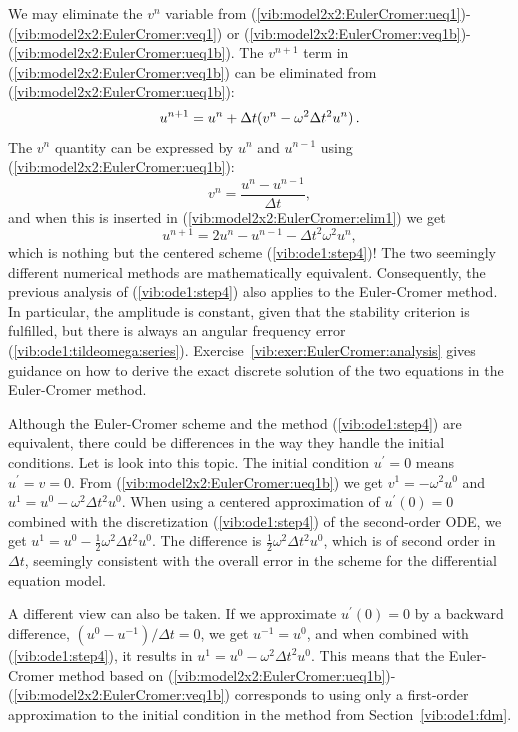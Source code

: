 \documentclass[%
oneside,                 %
final,                   %
10pt]{article}
\begin{document}
We may eliminate the $v^n$ variable from
(\ref{vib:model2x2:EulerCromer:ueq1})-(\ref{vib:model2x2:EulerCromer:veq1})
or
(\ref{vib:model2x2:EulerCromer:veq1b})-(\ref{vib:model2x2:EulerCromer:ueq1b}).
The $v^{n+1}$ term in (\ref{vib:model2x2:EulerCromer:veq1b}) can
be eliminated from (\ref{vib:model2x2:EulerCromer:ueq1b}):
\begin{equation}
u^{n+1} = u^n + \Delta t (v^n - \omega^2\Delta t^2 u^n)\tp
\label{vib:model2x2:EulerCromer:elim1}
\end{equation}
The $v^{n}$ quantity can be expressed by $u^n$ and $u^{n-1}$
using (\ref{vib:model2x2:EulerCromer:ueq1b}):
\[ v^{n} = \frac{u^n - u^{n-1}}{\Delta t},
\]
and when this is inserted in (\ref{vib:model2x2:EulerCromer:elim1}) we get
\begin{equation}
u^{n+1} = 2u^n - u^{n-1} - \Delta t^2 \omega^2u^{n},
\end{equation}
which is nothing but the centered scheme (\ref{vib:ode1:step4})!
The two seemingly different numerical methods are mathematically
equivalent. Consequently,
the previous analysis of
(\ref{vib:ode1:step4}) also applies to the Euler-Cromer
method. In particular, the amplitude is constant, given that the stability
criterion is fulfilled, but there is always an angular frequency error
(\ref{vib:ode1:tildeomega:series}). Exercise~\ref{vib:exer:EulerCromer:analysis}
gives guidance on how to derive the exact discrete solution of
the two equations in the Euler-Cromer method.

Although the Euler-Cromer scheme and the method (\ref{vib:ode1:step4}) are
equivalent, there could be differences in the way they handle
the initial conditions. Let is look into this topic.
The initial condition $u^{\prime}=0$ means $u^{\prime}=v=0$.  From
(\ref{vib:model2x2:EulerCromer:ueq1b}) we get $v^1=-\omega^2 u^0$
and $u^1=u^0 - \omega^2\Delta t^2 u^0$. When using
a centered approximation of $u^{\prime}(0)=0$ combined with the
discretization (\ref{vib:ode1:step4}) of the second-order ODE, we
get $u^1=u^0 - \frac{1}{2}\omega^2\Delta t^2 u^0$. The difference
is $\frac{1}{2}\omega^2\Delta t^2 u^0$, which is of second order in $\Delta t$,
seemingly
consistent with the overall error in the scheme for the differential equation
model.

A different view can also be taken.
If we approximate $u^{\prime}(0)=0$ by a backward difference,
$(u^0-u^{-1})/\Delta t =0$, we get $u^{-1}=u^0$, and when combined
with (\ref{vib:ode1:step4}), it results in
$u^1=u^0 - \omega^2\Delta t^2 u^0$. This means that
the Euler-Cromer method based on
(\ref{vib:model2x2:EulerCromer:ueq1b})-(\ref{vib:model2x2:EulerCromer:veq1b})
corresponds to using only a first-order approximation to the initial condition
in the method from Section~\ref{vib:ode1:fdm}.
\end{document}
